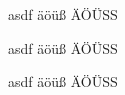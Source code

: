 \documentclass[]{book}
\begin{document}
{
asdf
äöüß ÄÖÜSS
}

{
\myregularfont
asdf
äöüß ÄÖÜSS
}

{
\myheaderfont
asdf
äöüß ÄÖÜSS
}
\end{document}
